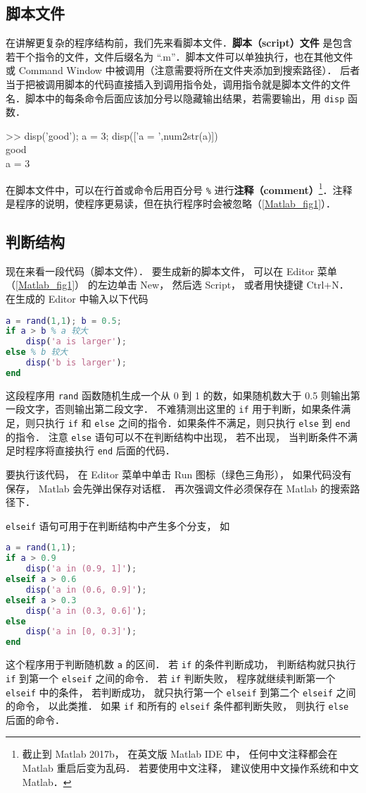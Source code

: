 

\subsection{脚本文件}
在讲解更复杂的程序结构前，我们先来看脚本文件．\textbf{脚本（script）文件} 是包含若干个指令的文件，文件后缀名为 “.m”．脚本文件可以单独执行，也在其他文件或 Command Window 中被调用（注意需要将所在文件夹添加到搜索路径）． 后者当于把被调用脚本的代码直接插入到调用指令处，调用指令就是脚本文件的文件名．脚本中的每条命令后面应该加分号以隐藏输出结果，若需要输出，用 \texttt{disp} 函数．
\begin{Command}
>> disp('good'); a = 3; disp(['a = ',num2str(a)]) \\
good \\
a = 3
\end{Command}
在脚本文件中，可以在行首或命令后用百分号 \texttt{\%} 进行\textbf{注释（comment）}\footnote{截止到 Matlab 2017b， 在英文版 Matlab IDE 中， 任何中文注释都会在 Matlab 重启后变为乱码． 若要使用中文注释， 建议使用中文操作系统和中文 Matlab．}．注释是程序的说明，使程序更易读，但在执行程序时会被忽略（\autoref{Matlab_fig1}）．

\subsection{判断结构}
现在来看一段代码（脚本文件）． 要生成新的脚本文件， 可以在 Editor 菜单（\autoref{Matlab_fig1}） 的左边单击 New， 然后选 Script， 或者用快捷键 Ctrl+N． 在生成的 Editor 中输入以下代码
\begin{lstlisting}[language=Matlab]
a = rand(1,1); b = 0.5;
if a > b % a 较大
    disp('a is larger');
else % b 较大
    disp('b is larger');
end
\end{lstlisting}
这段程序用 \texttt{rand} 函数随机生成一个从 0 到 1 的数，如果随机数大于 0.5 则输出第一段文字，否则输出第二段文字． 不难猜测出这里的 \texttt{if} 用于判断，如果条件满足，则只执行 \texttt{if} 和 \texttt{else} 之间的指令．如果条件不满足，则只执行 \texttt{else} 到 \texttt{end} 的指令． 注意 \texttt{else} 语句可以不在判断结构中出现， 若不出现， 当判断条件不满足时程序将直接执行 \texttt{end} 后面的代码．

要执行该代码， 在 Editor 菜单中单击 Run 图标（绿色三角形）， 如果代码没有保存， Matlab 会先弹出保存对话框． 再次强调文件必须保存在 Matlab 的搜索路径下．

\texttt{elseif} 语句可用于在判断结构中产生多个分支， 如
\begin{lstlisting}[language=Matlab]
a = rand(1,1);
if a > 0.9
    disp('a in (0.9, 1]');
elseif a > 0.6
    disp('a in (0.6, 0.9]');
elseif a > 0.3
    disp('a in (0.3, 0.6]');
else
    disp('a in [0, 0.3]');
end
\end{lstlisting}
这个程序用于判断随机数 \texttt{a} 的区间． 若 \texttt{if} 的条件判断成功， 判断结构就只执行 \texttt{if} 到第一个 \texttt{elseif} 之间的命令． 若 \texttt{if} 判断失败， 程序就继续判断第一个 \texttt{elseif} 中的条件， 若判断成功， 就只执行第一个 \texttt{elseif} 到第二个 \texttt{elseif} 之间的命令， 以此类推． 如果 \texttt{if} 和所有的 \texttt{elseif} 条件都判断失败， 则执行 \texttt{else} 后面的命令．

